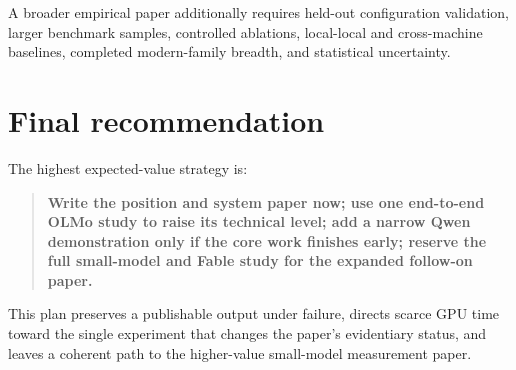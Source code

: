 \documentclass[11pt]{article}
\begin{document}
A broader empirical paper additionally requires held-out configuration validation, larger benchmark samples, controlled ablations, local-local and cross-machine baselines, completed modern-family breadth, and statistical uncertainty.

\section{Final recommendation}

The highest expected-value strategy is:

\begin{quote}
\textbf{Write the position and system paper now; use one end-to-end OLMo study to raise its technical level; add a narrow Qwen demonstration only if the core work finishes early; reserve the full small-model and Fable study for the expanded follow-on paper.}
\end{quote}

This plan preserves a publishable output under failure, directs scarce GPU time toward the single experiment that changes the paper's evidentiary status, and leaves a coherent path to the higher-value small-model measurement paper.
\end{document}
